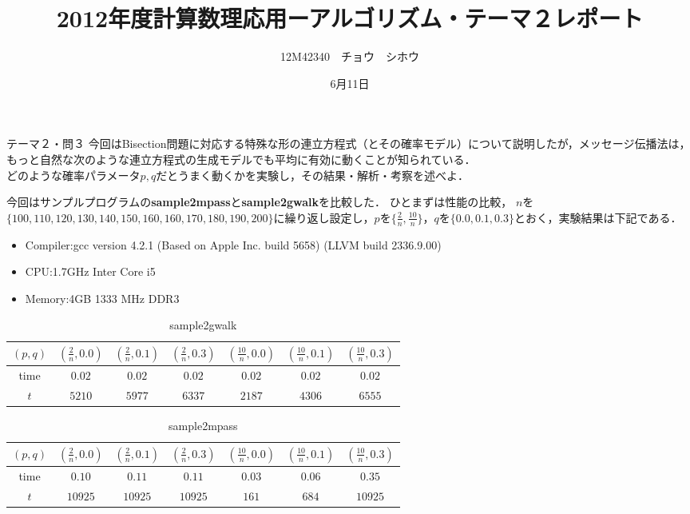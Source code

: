 \documentclass[a4paper,11pt]{jsarticle}
\title{2012年度計算数理応用ーアルゴリズム・テーマ２レポート}
\author{12M42340　チョウ　シホウ}
\date{6月11日}
\numberwithin{theorem}{section}  %
\numberwithin{equation}{section} %
\begin{document}
{}
\renewcommand{\thepart}{\arabic{part}}

\begin{itembox}[l]{テーマ２・問３}
今回はBisection問題に対応する特殊な形の連立方程式（とその確率モデル）について説明したが，メッセージ伝播法は，もっと自然な次のような連立方程式の生成モデルでも平均に有効に動くことが知られている．\\
どのような確率パラメータ$p,q$だとうまく動くかを実験し，その結果・解析・考察を述べよ．
\end{itembox}

今回はサンプルプログラムの{\bf sample2mpass}と{\bf sample2gwalk}を比較した．
ひとまずは性能の比較，
$n$を$\{100,110,120,130,140,150,160,160,170,180,190,200\}$に繰り返し設定し，$p$を$\{\frac{2}{n},\frac{10}{n}\}$，$q$を$\{0.0,0.1,0.3\}$とおく，実験結果は下記である．
\begin{itemize}
\item
Compiler:gcc version 4.2.1 (Based on Apple Inc. build 5658) (LLVM build 2336.9.00)
\item
CPU:1.7GHz Inter Core i5
\item
Memory:4GB 1333 MHz DDR3

\end{itemize}
\begin{table}[htdp]
\caption{sample2gwalk}
\begin{center}
\begin{tabular}{|c|c|c|c|c|c|c|}
\hline
$(p,q)$  & $(\frac{2}{n},0.0)$ & $(\frac{2}{n},0.1)$ & $(\frac{2}{n},0.3)$ & $(\frac{10}{n},0.0)$ & $(\frac{10}{n},0.1)$ & $(\frac{10}{n},0.3)$ \\
\hline
time & $0.02$ & $0.02$ & $0.02$ & $0.02$ & $0.02$ & $0.02$\\
\hline
$t$ & $5210$ & $5977$ & $6337$ & $2187$ & $4306$ & $6555$\\
\hline
\end{tabular}
\end{center}
\label{default}
\end{table}
\begin{table}[htdp]
\caption{sample2mpass}
\begin{center}
\begin{tabular}{|c|c|c|c|c|c|c|}
\hline
$(p,q)$  & $(\frac{2}{n},0.0)$ & $(\frac{2}{n},0.1)$ & $(\frac{2}{n},0.3)$ & $(\frac{10}{n},0.0)$ & $(\frac{10}{n},0.1)$ & $(\frac{10}{n},0.3)$ \\
\hline
time & $0.10$ & $0.11$ & $0.11$ & $0.03$ & $0.06$ & $0.35$\\
\hline
$t$ & $10925$ & $10925$ & $10925$ & $161$ & $684$ & $10925$\\
\hline
\end{tabular}
\end{center}
\label{default}
\end{table}
\end{document}
